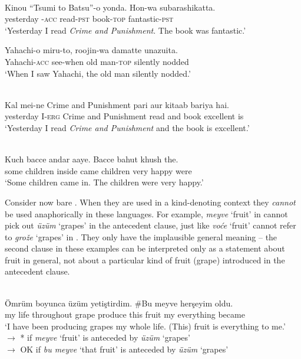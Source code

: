 \documentclass[output=paper,
modfonts
]{langscibook}
\begin{document}
	\ea \label{ex:despic:9}
	 \\
	\ea \label{ex:despic:9a}
	\gll
	{Kinou} {``Tsumi to Batsu''-o} {yonda}. {Hon-wa} {subarashikatta}. \\
	yesterday \phantom{``}{Crime and Punishment}-\textsc{acc} read-\textsc{pst} book-\textsc{top} fantastic-\textsc{pst} \\ 
	\glt `Yesterday I read \textit{Crime and Punishment}. The book was fantastic.' 
	
	\ex \label{ex:despic:9b}
	\gll 
	{Yahachi-o} {miru-to}, {roojin-wa} {damatte} {unazuita}. \\
	Yahachi-\textsc{acc} see-when {old man-\textsc{top}} silently nodded \\ 
	\glt `When I saw Yahachi, the old man silently nodded.' \citep[14]{Fujisawa1992}
	\z
	\z 
	
	\ea \label{ex:despic:10}
	 \\ 
	\gll 
	{Kal} {mei-ne} {Crime and Punishment} {pari} {aur} {kitaab} {bariya} {hai.} \\
	yesterday I-\textsc{erg} {Crime and Punishment} read and book excellent is \\ 
	\glt `Yesterday I read \textit{Crime and Punishment} and the book is excellent.'
	\z
	
	\ea \label{ex:despic:11}
	 \\
	\gll
	{Kuch} {bacce} {andar} {aaye}. {Bacce} {bahut} {khush} {the.} \\
	some children inside came children very happy were \\ 
	\glt `Some children came in. The children were very happy.' \citep[403]{Dayal2004}
	\z 
	
	Consider now bare . When they are used in a kind-denoting context they \textit{cannot} be
	used anaphorically in these languages. For example, \textit{meyve} `fruit' in  cannot pick out \textit{\"uz\"um} `grapes' in the antecedent clause, just like \textit{vo\'ce} `fruit' cannot refer to \textit{gro\v z\dj e} `grapes' in . They only have the implausible general meaning -- the second clause in these examples can be interpreted only as a statement about fruit in general, not about a particular kind of fruit (grape) introduced in the antecedent clause. 
	
	
	\ea \label{ex:despic:12}
	 \\
	\gll 
	{\"Omr\"um} {boyunca} {\"uz\"um} {yeti\c stirdim}. {\textnormal{\#}{\op}Bu{\cp}} {meyve} {her\c seyim} {oldu}. \\
	{my life} throughout grape produce \phantom{(\#}this fruit {my everything} became \\ 
	\glt `I have been producing grapes my whole life. (This) fruit is everything to me.' \\ 
	$\rightarrow$ * if \textit{meyve} `fruit' is anteceded by \textit{\"uz\"um} `grapes' \\
	$\rightarrow$ OK if \textit{bu meyve} `that fruit' is anteceded by \textit{\"uz\"um} `grapes'
	\z 
	
\end{document}
